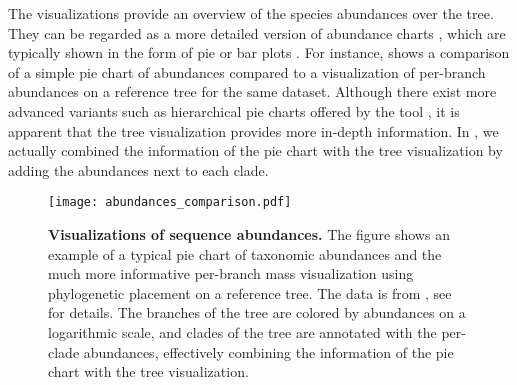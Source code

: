 The visualizations provide an overview of the species abundances over the tree.
They can be regarded as a more detailed version of abundance charts \cite{Huttenhower2012},
which are typically shown in the form of pie or bar plots \cite{Faust2015,Mahe2017,Lentendu2018}.
For instance,  shows a comparison of a simple pie chart of abundances
compared to a visualization of per-branch abundances on a reference tree for the same dataset.
Although there exist more advanced variants such as
hierarchical pie charts offered by the  tool \cite{Ondov2011},
it is apparent that the tree visualization provides more in-depth information.
In , we actually combined the information of the pie chart
with the tree visualization by adding the abundances next to each clade.

\begin{figure}[!ht]
    \centering
    \texttt{[image: abundances\_comparison.pdf]}
    \begin{subfigure}{0pt}
        \label{fig:abundances_comparison:sub:pie_chart}
    \end{subfigure}
    \begin{subfigure}{0pt}
        \label{fig:abundances_comparison:sub:branch_colors}
    \end{subfigure}
    \caption[Visualizations of sequence abundances]{
        \textbf{Visualizations of sequence abundances.}
        The figure shows an example of
         a typical pie chart of taxonomic abundances and
         the much more informative per-branch mass visualization
        using phylogenetic placement on a reference tree.
        The data is from , see  for details.
        The branches of the tree are colored by abundances on a logarithmic scale,
        and clades of the tree are annotated with the per-clade abundances,
        effectively combining the information of the pie chart with the tree visualization.
    }
    \label{fig:abundances_comparison}
\end{figure}

